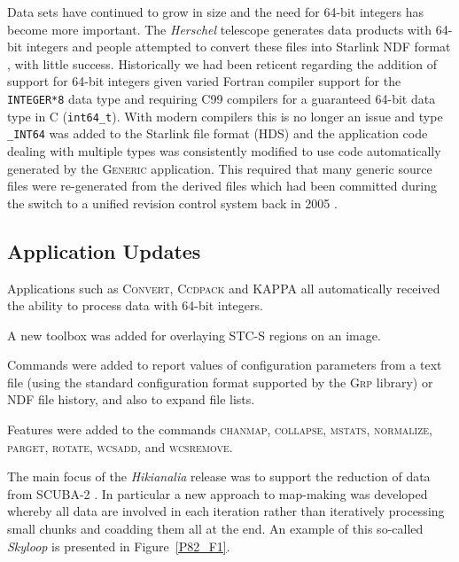 \documentclass[11pt,twoside]{article}
\begin{document}
Data sets have continued to grow in size and the need for 64-bit
integers has become more important. The \textit{Herschel} telescope
generates data products with 64-bit integers and people attempted to
convert these files into Starlink NDF format \citep[see][for an
overview of NDF]{P91_adassxxiii}, with little success. Historically we
had been reticent regarding the addition of support for 64-bit
integers given varied Fortran compiler support for the
\texttt{INTEGER*8} data type and requiring C99 compilers for a
guaranteed 64-bit data type in C (\texttt{int64\_t}). With modern
compilers this is no longer an issue and type \texttt{\_INT64} was
added to the Starlink file format (HDS) and the application code
dealing with multiple types was consistently modified to use code
automatically generated by the \textsc{Generic} application. This
required that many generic source files were re-generated from the
derived files which had been committed during the switch to a unified
revision control system back in 2005 \citep{2005ASPC..347..119G}.

\subsection*{Application Updates}

Applications such as \textsc{Convert}, \textsc{Ccdpack} and
\textsc{KAPPA} all automatically received the ability to process data
with 64-bit integers.


A new toolbox was added for overlaying STC-S regions on an image.



Commands were added to report values of configuration parameters from
a text file (using the standard configuration format supported by the
\textsc{Grp} library) or NDF file history, and also to expand file lists.

Features were added to the commands \textsc{chanmap},
\textsc{collapse}, \textsc{mstats}, \textsc{normalize},
\textsc{parget}, \textsc{rotate}, \textsc{wcsadd}, and
\textsc{wcsremove}.


The main focus of the \textit{Hikianalia} release was to support the
reduction of data from SCUBA-2
\citep{2013MNRAS.430.2545C,2013MNRAS.430.2513H}. In particular a new
approach to map-making was developed whereby all data are involved in
each iteration rather than iteratively processing small chunks and
coadding them all at the end.  An example of this so-called
\textit{Skyloop} is presented in Figure~\ref{P82_F1}.
\end{document}
